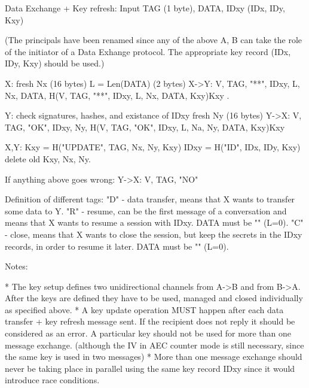 Data Exchange + Key refresh: Input TAG (1 byte), DATA, IDxy (IDx, IDy,
Kxy)

(The principals have been renamed since any of the above A, B can take
the role of the initiator of a Data Exhange protocol. The appropriate
key record (IDx, IDy, Kxy) should be used.)


X: fresh Nx (16 bytes)
   L = Len(DATA) (2 bytes)
   X->Y: V, TAG, "**", IDxy, L, {Nx, DATA, H(V, TAG, "**", IDxy, L, Nx,
         DATA, Kxy)}Kxy .

Y: check signatures, hashes, and existance of IDxy
   fresh Ny (16 bytes)
   Y->X: V, TAG, "OK", IDxy, {Ny, H(V, TAG, "OK", IDxy, L, Na, Ny, DATA,
         Kxy)}Kxy

X,Y: Kxy = H("UPDATE", TAG, Nx, Ny, Kxy)
     IDxy = H("ID", IDx, IDy, Kxy)
     delete old Kxy, Nx, Ny.

If anything above goes wrong:
Y->X: V, TAG, "NO"

Definition of different tags:
"D" - data transfer, means that X wants to transfer some data to Y.
"R" - resume, can be the first message of a conversation and means that
      X wants to resume a session with IDxy. DATA must be "" (L=0).
"C" - close, means that X wants to close the session, but keep the
      secrets in the IDxy records, in order to resume it later. DATA
      must be "" (L=0).

Notes:

* The key setup defines two unidirectional channels from A->B and from
B->A. After the keys are defined they have to be used, managed and
closed individually as specified above.
* A key update operation MUST happen after each data transfer + key
refresh message sent. If the recipient does not reply it should be
considered as an error. A particular key should not be used for more
than one message exchange. (although the IV in AEC counter mode is still
necessary, since the same key is used in two messages)
* More than one message exchange should never be taking place in
parallel using the same key record IDxy since it would introduce race
conditions.
